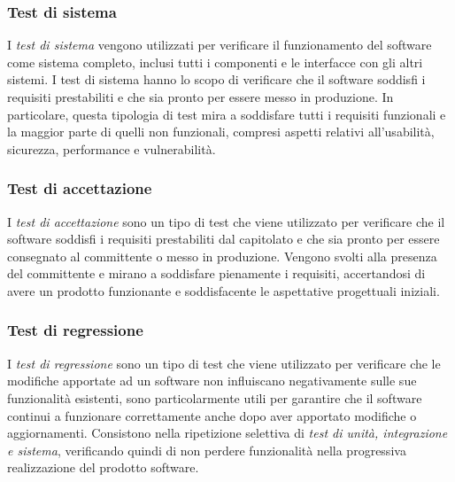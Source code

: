 \subsubsection{Test di sistema}

I \textit{test di sistema} vengono utilizzati per verificare il funzionamento del software come sistema
completo, inclusi tutti i componenti e le interfacce con gli altri sistemi. I test di sistema hanno lo
scopo di verificare che il software soddisfi i requisiti prestabiliti e che sia pronto per essere messo in
produzione. In particolare, questa tipologia di test mira a soddisfare tutti i requisiti funzionali e la maggior parte di quelli non funzionali, compresi aspetti relativi all’usabilità, sicurezza,
performance e vulnerabilità.

\subsubsection{Test di accettazione}

I \textit{test di accettazione} sono un tipo di test che viene utilizzato per verificare che il software soddisfi i requisiti prestabiliti dal capitolato e che sia pronto per essere consegnato al committente o messo in produzione.
Vengono svolti alla presenza del committente e mirano a soddisfare pienamente i requisiti,
accertandosi di avere un prodotto funzionante e soddisfacente le aspettative progettuali iniziali.

\subsubsection{Test di regressione}

I \textit{test di regressione} sono un tipo di test che viene utilizzato per verificare che le modifiche apportate ad un software non influiscano negativamente sulle sue funzionalità esistenti, sono particolarmente utili per garantire che il software continui a funzionare correttamente anche dopo aver apportato modifiche o aggiornamenti.
Consistono nella ripetizione selettiva di \textit{test di unità, integrazione e sistema}, verificando quindi di non perdere funzionalità nella progressiva realizzazione del prodotto software.

\pagebreak

